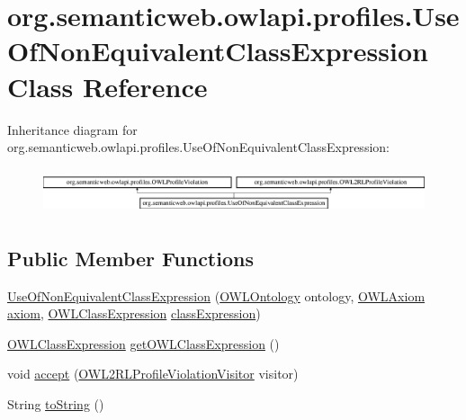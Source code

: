 \hypertarget{classorg_1_1semanticweb_1_1owlapi_1_1profiles_1_1_use_of_non_equivalent_class_expression}{\section{org.\-semanticweb.\-owlapi.\-profiles.\-Use\-Of\-Non\-Equivalent\-Class\-Expression Class Reference}
\label{classorg_1_1semanticweb_1_1owlapi_1_1profiles_1_1_use_of_non_equivalent_class_expression}
}
Inheritance diagram for org.\-semanticweb.\-owlapi.\-profiles.\-Use\-Of\-Non\-Equivalent\-Class\-Expression\-:\begin{figure}[H]
\begin{center}
\leavevmode
\includegraphics[height=1.352657cm]{classorg_1_1semanticweb_1_1owlapi_1_1profiles_1_1_use_of_non_equivalent_class_expression}
\end{center}
\end{figure}
\subsection*{Public Member Functions}
\begin{DoxyCompactItemize}
\item 
\hyperlink{classorg_1_1semanticweb_1_1owlapi_1_1profiles_1_1_use_of_non_equivalent_class_expression_a8a8695f537c32d1f718a9f5f2ebe7260}{Use\-Of\-Non\-Equivalent\-Class\-Expression} (\hyperlink{interfaceorg_1_1semanticweb_1_1owlapi_1_1model_1_1_o_w_l_ontology}{O\-W\-L\-Ontology} ontology, \hyperlink{interfaceorg_1_1semanticweb_1_1owlapi_1_1model_1_1_o_w_l_axiom}{O\-W\-L\-Axiom} \hyperlink{classorg_1_1semanticweb_1_1owlapi_1_1profiles_1_1_o_w_l_profile_violation_aa7c8e8910ed3966f64a2c003fb516214}{axiom}, \hyperlink{interfaceorg_1_1semanticweb_1_1owlapi_1_1model_1_1_o_w_l_class_expression}{O\-W\-L\-Class\-Expression} \hyperlink{classorg_1_1semanticweb_1_1owlapi_1_1profiles_1_1_use_of_non_equivalent_class_expression_ad9113baf025316a69d4c99a670f45de8}{class\-Expression})
\item 
\hyperlink{interfaceorg_1_1semanticweb_1_1owlapi_1_1model_1_1_o_w_l_class_expression}{O\-W\-L\-Class\-Expression} \hyperlink{classorg_1_1semanticweb_1_1owlapi_1_1profiles_1_1_use_of_non_equivalent_class_expression_a326134a53aa0afd222f048ebce0a9895}{get\-O\-W\-L\-Class\-Expression} ()
\item 
void \hyperlink{classorg_1_1semanticweb_1_1owlapi_1_1profiles_1_1_use_of_non_equivalent_class_expression_a6b5103940b83909aec64a0b4d57f3b8f}{accept} (\hyperlink{interfaceorg_1_1semanticweb_1_1owlapi_1_1profiles_1_1_o_w_l2_r_l_profile_violation_visitor}{O\-W\-L2\-R\-L\-Profile\-Violation\-Visitor} visitor)
\item 
String \hyperlink{classorg_1_1semanticweb_1_1owlapi_1_1profiles_1_1_use_of_non_equivalent_class_expression_a35a4fa6cd0aa42e830547f961c52ea1a}{to\-String} ()
\end{DoxyCompactItemize}
